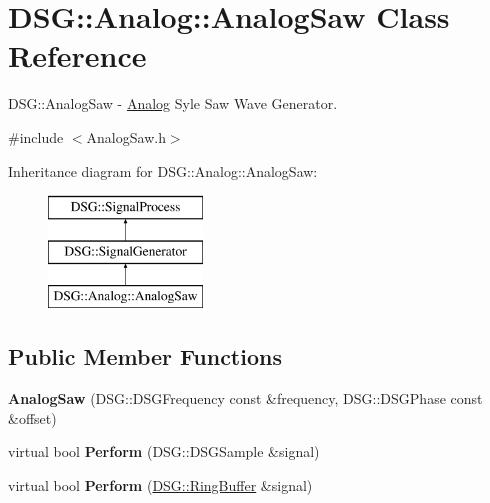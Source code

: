 \hypertarget{class_d_s_g_1_1_analog_1_1_analog_saw}{\section{D\+S\+G\+:\+:Analog\+:\+:Analog\+Saw Class Reference}
\label{class_d_s_g_1_1_analog_1_1_analog_saw}
}


D\+S\+G\+::\+Analog\+Saw -\/ \hyperlink{namespace_d_s_g_1_1_analog}{Analog} Syle Saw Wave Generator.  




{\ttfamily \#include $<$Analog\+Saw.\+h$>$}

Inheritance diagram for D\+S\+G\+:\+:Analog\+:\+:Analog\+Saw\+:\begin{figure}[H]
\begin{center}
\leavevmode
\includegraphics[height=3.000000cm]{class_d_s_g_1_1_analog_1_1_analog_saw}
\end{center}
\end{figure}
\subsection*{Public Member Functions}
\begin{DoxyCompactItemize}
\item 
\hypertarget{class_d_s_g_1_1_analog_1_1_analog_saw_ad110da0b337948fb70ecdfad7dbb5ddf}{{\bfseries Analog\+Saw} (D\+S\+G\+::\+D\+S\+G\+Frequency const \&frequency, D\+S\+G\+::\+D\+S\+G\+Phase const \&offset)}\label{class_d_s_g_1_1_analog_1_1_analog_saw_ad110da0b337948fb70ecdfad7dbb5ddf}

\item 
\hypertarget{class_d_s_g_1_1_analog_1_1_analog_saw_a8d36e77c09ba84128e786c7bb14cddda}{virtual bool {\bfseries Perform} (D\+S\+G\+::\+D\+S\+G\+Sample \&signal)}\label{class_d_s_g_1_1_analog_1_1_analog_saw_a8d36e77c09ba84128e786c7bb14cddda}

\item 
\hypertarget{class_d_s_g_1_1_analog_1_1_analog_saw_a38f091059d924c9141fee3e27522e7e1}{virtual bool {\bfseries Perform} (\hyperlink{class_d_s_g_1_1_ring_buffer}{D\+S\+G\+::\+Ring\+Buffer} \&signal)}\label{class_d_s_g_1_1_analog_1_1_analog_saw_a38f091059d924c9141fee3e27522e7e1}

\end{DoxyCompactItemize}

